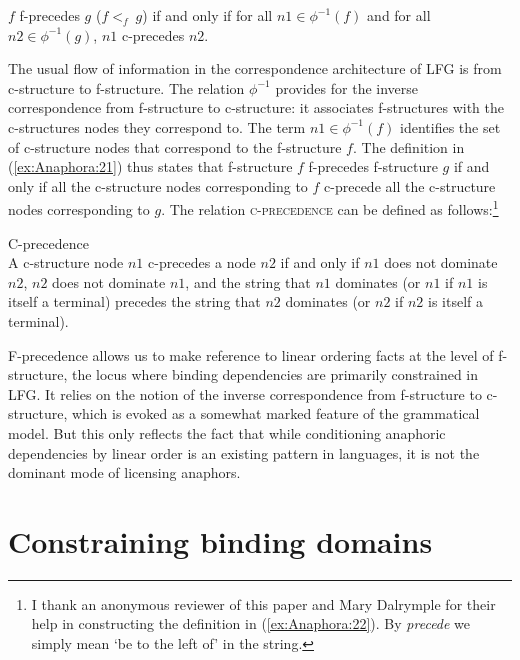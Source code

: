 \documentclass[output=paper,hidelinks]{langscibook}
\begin{document}
\ea\label{ex:Anaphora:21}  $f$ f-precedes $g$ ($f <_f\ g$) if and only if for all $n1 \in \phi^{-1}(f)$ and for all $n2 \in \phi^{-1}(g)$, $n1$ c-precedes $n2$.
\z

\noindent The usual flow of information in the correspondence architecture of LFG is from c-structure to f-structure. The relation $\phi^{-1}$ provides for the inverse correspondence from f-structure to c-structure: it associates f-structures with the c-struc\-tures nodes they correspond to. The term $n1 \in \phi^{-1}(f)$ identifies the set of c-structure nodes that correspond to the f-structure $f$. The definition in (\ref{ex:Anaphora:21}) thus states that f-structure $f$ f-precedes f-structure $g$ if and only if all the c-structure nodes corresponding to $f$ c-precede all the c-structure nodes corresponding to $g$. The relation \textsc{c-precedence} can be defined as follows:\footnote{I thank an anonymous reviewer of this paper and Mary Dalrymple for their help in constructing the definition in (\ref{ex:Anaphora:22}). By \emph{precede} we simply mean `be to the left of' in the string.}

\ea\label{ex:Anaphora:22} C-precedence\\[1ex]
A c-structure node $n1$ c-precedes a node $n2$ if and only if $n1$ does  not dominate $n2$, $n2$ does not dominate $n1$, and the string that $n1$  dominates (or $n1$ if $n1$ is itself a terminal) precedes the string  that $n2$ dominates (or $n2$ if $n2$ is itself a terminal).
\z

\noindent F-precedence allows us to make reference to linear ordering facts at the level of f-structure, the locus where binding dependencies are primarily constrained in LFG. It relies on the notion of the inverse correspondence from f-structure to c-structure, which is evoked as a somewhat marked feature of the grammatical model. But this only reflects the fact that while conditioning anaphoric dependencies by linear order is an existing pattern in languages, it is not the dominant mode of licensing anaphors.

\section{Constraining binding domains}
\label{sec:Anaphora:3}
\end{document}
